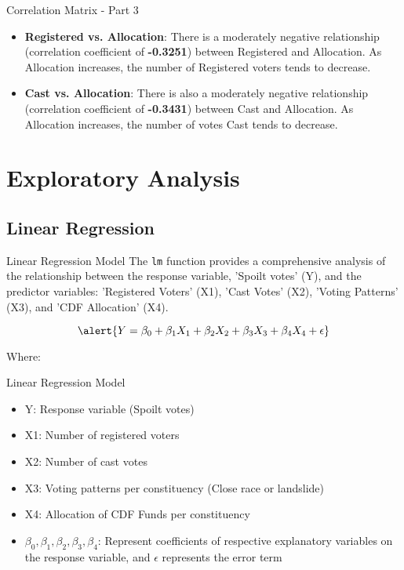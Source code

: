 \documentclass{beamer}
\begin{document}
\begin{frame}{Correlation Matrix - Part 3}
\begin{itemize}
\item \textbf{Registered vs. Allocation}: There is a moderately negative relationship (correlation coefficient of \textbf{-0.3251}) between Registered and Allocation. As Allocation increases, the number of Registered voters tends to decrease.
\item \textbf{Cast vs. Allocation}: There is also a moderately negative relationship (correlation coefficient of \textbf{-0.3431}) between Cast and Allocation. As Allocation increases, the number of votes Cast tends to decrease.
\end{itemize}
\end{frame}


\section{Exploratory Analysis}
\subsection{Linear Regression}


\begin{frame}{Linear Regression Model}
The \texttt{lm} function provides a comprehensive analysis of the relationship between the response variable, 'Spoilt votes' (Y), and the predictor variables: 'Registered Voters' (X1), 'Cast Votes' (X2), 'Voting Patterns' (X3), and 'CDF Allocation' (X4).

\[
\alert{Y = \beta_0 + \beta_1X_1 + \beta_2X_2 + \beta_3X_3 + \beta_4X_4 + \epsilon}
\]

Where:
\end{frame}
\begin{frame}{Linear Regression Model}
\begin{itemize}
\item \alert{Y}: Response variable (Spoilt votes)
\item \alert{X1}: Number of registered voters
\item \alert{X2}: Number of cast votes
\item \alert{X3}: Voting patterns per constituency (Close race or landslide)
\item \alert{X4}: Allocation of CDF Funds per constituency
\item \alert{$\beta_0, \beta_1, \beta_2, \beta_3, \beta_4$}: Represent coefficients of respective explanatory variables on the response variable, and $\epsilon$ represents the error term
\end{itemize}
\end{frame}
\end{document}
